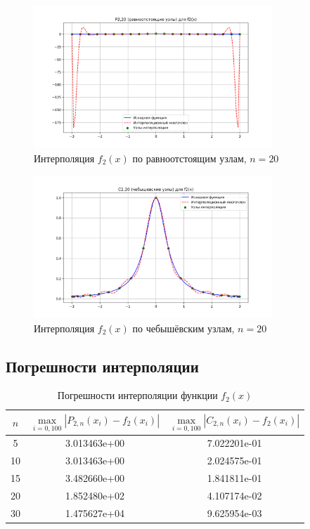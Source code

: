 \documentclass[12pt]{article}
\begin{document}
\begin{figure}[H]
    \centering
    \includegraphics[width=0.8\textwidth]{P2_20.png}
    \caption{Интерполяция $f_2(x)$ по равноотстоящим узлам, $n=20$}
\end{figure}

\begin{figure}[H]
    \centering
    \includegraphics[width=0.8\textwidth]{C2_20.png}
    \caption{Интерполяция $f_2(x)$ по чебышёвским узлам, $n=20$}
\end{figure}

\subsection{Погрешности интерполяции}

\begin{table}[H]
    \centering
    \begin{tabular}{|c|c|c|}
        \hline
        $n$ & $\max\limits_{i=0,100} |P_{2,n}(x_i) - f_2(x_i)|$ & $\max\limits_{i=0,100} |C_{2,n}(x_i) - f_2(x_i)|$ \\
        \hline
        5 & 3.013463e+00 & 7.022201e-01 \\
        \hline
        10 & 3.013463e+00 & 2.024575e-01 \\
        \hline
        15 & 3.482660e+00 & 1.841811e-01 \\
        \hline
        20 & 1.852480e+02 & 4.107174e-02 \\
        \hline
        30 & 1.475627e+04 & 9.625954e-03 \\
        \hline
    \end{tabular}
    \caption{Погрешности интерполяции функции $f_2(x)$}
\end{table}
\end{document}

